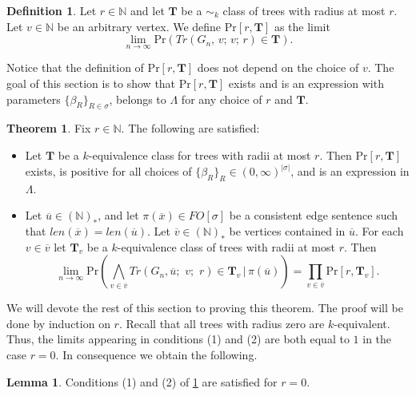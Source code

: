 \documentclass[12pt,notitlepage,a4paper]{article}
\theoremstyle{definition}
\newtheorem{theorem}{Theorem}[section]
\newtheorem{lemma}{Lemma}[section]
\newtheorem{definition}{Definition}[section]
\newcommand{\N}{\mathbb{N}}
\newcommand{\Ln}{\lim\limits_{n\to \infty}}
\begin{document}
\begin{definition}
	Let $r\in \N$ and let $\mathbf{T}$ be a $\sim_k$ class
	of trees with radius at most $r$. Let $v\in \N$ be an arbitrary 
	vertex. We define $\mathrm{Pr}[r,\mathbf{T}]$ as the limit
	\[
	\Ln \mathrm{Pr}\left(
	Tr(G_n,\,v;\,v;\,r)\in \mathbf{T}\right).
	\]
\end{definition}

Notice that the 
definition of  $\mathrm{Pr}[r,\mathbf{T}]$ does not depend on the
choice of $v$. The goal of this section is to show 
that $\mathrm{Pr}[r,\mathbf{T}]$ exists and is
an expression with parameters
$\{\beta_R\}_{R\in\sigma}$, belongs to $\Lambda$ 
for any choice of $r$ and $\mathbf{T}$. \par




\begin{theorem} \label{thm:BigTrees}
	Fix $r\in \N$. The following are satisfied:
	\begin{itemize}
		\item[(1)] Let $\mathbf{T}$ be a
		$k$-equivalence class for trees with radii at most $r$.	Then 
		$
		\mathrm{Pr}[r,\mathbf{T}]
		$
		exists,
		is positive for all choices of 
		$\{\beta_R\}_{R}\in (0,\infty)^{|\sigma|}$,
		and is an expression
		in $\Lambda$.
		\item[(2)] Let $\overline{u}\in (\N)_*$,
		and let $\pi(\overline{x})\in FO[\sigma]$ be a consistent
		edge sentence such that 
		$len(\overline{x})=len(\overline{u})$.
		Let $\overline{v}\in (\N)_*$ be vertices contained
		in $\overline{u}$. For each $v\in \overline{v}$
		let $\mathbf{T}_v$ be a $k$-equivalence class
		of trees with radii	at most $r$. Then
		\[
		\Ln \mathrm{Pr}\left( \bigwedge_{v\in \overline{v}} 
		Tr\left(G_n, \overline{u};\,\,v;\,\,r\right)\in \mathbf{T}_v 
		\, | \, \pi(\overline{u})
		\right)= \prod_{v\in \overline{v}} \mathrm{Pr}[r,\mathbf{T}_v]. \]	 	
	\end{itemize}
\end{theorem}
We will devote the rest of this section to proving this
theorem. The proof will be done by induction on $r$. 
Recall that	all trees with radius zero are $k$-equivalent. Thus,
the limits appearing in conditions (1) and (2) are both equal to $1$
in the case $r=0$. In consequence we obtain the following. 

\begin{lemma}
	Conditions (1) and (2) of \cref{thm:BigTrees} 
	are satisfied for $r=0$.
\end{lemma}
\end{document}
